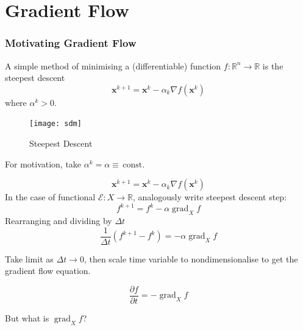 \documentclass{beamer}
\theoremstyle{remark}
\newcommand{\const}{\, \text{const.}}
\newcommand{\xbf}{\mathbf{x}}
\DeclareMathOperator{\grad}{grad}
\begin{document}
\section{Gradient Flow}
\begin{frame}
    \frametitle{Motivating Gradient Flow}
    A simple method of minimising a (differentiable) function $f:\mathbb{R}^n \rightarrow \mathbb{R}$ is the steepest descent \cite{doi:10.1137/1.9781611974997.ch8}
    \begin{equation}
        \xbf^{k+1} = \xbf^k - \alpha_k \nabla f \left( \xbf^k \right)
    \end{equation}
    where $\alpha^k > 0$.
    \begin{figure}[h]
        \centering
        \texttt{[image: sdm]}
        \caption{Steepest Descent}
    \end{figure}
    {
        For motivation, take $\alpha^k = \alpha \equiv \const$
    }
\end{frame}

\begin{frame}
    \begin{equation*}
        \xbf^{k+1} = \xbf^k - \alpha_k \nabla f \left( \xbf^k \right)
    \end{equation*}
    In the case of functional $\mathcal{E}: X \rightarrow \mathbb{R}$, analogously write steepest descent step:
    \begin{equation*}
        f^{k+1} = f^k - \alpha \grad_X f
    \end{equation*}
    {
        Rearranging and dividing by $\Delta t$
        \begin{equation*}
            \frac{1}{\Delta t} \left( f^{k+1} - f^k \right) = -\alpha \grad_X f
        \end{equation*}
    }
    {
        Take limit as $\Delta t \rightarrow 0$, then scale time variable to nondimensionalise to get the gradient flow equation.
        \begin{definition}
            \begin{equation*}
                \frac{\partial f}{\partial t} = - \grad_X f
            \end{equation*}
        \end{definition}
        But what is $\grad_X f$?
    }
\end{frame}
\end{document}

